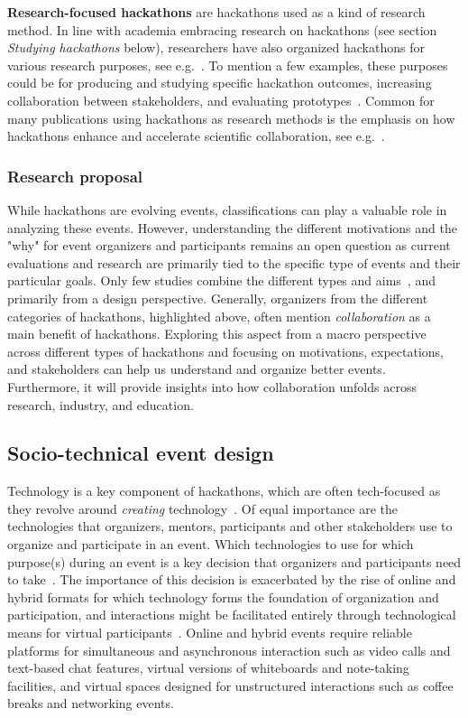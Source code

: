 \documentclass{ieeeaccess}
\begin{document}
\textbf{Research-focused hackathons} are hackathons used as a kind of research method.
In line with academia embracing research on hackathons (see section \textit{Studying hackathons} below), researchers have also organized hackathons for various research purposes, see e.g.~\cite{pe2019understanding,ghouila2018hackathons,groen2015science,falk202010}.
To mention a few examples, these purposes could be for producing and studying specific hackathon outcomes, increasing collaboration between stakeholders, and evaluating prototypes~\cite{falk202010}. 
Common for many publications using hackathons as research methods is the emphasis on how hackathons enhance and accelerate scientific collaboration, see e.g.~\cite{ghouila2018hackathons}.

\subsubsection{Research proposal}
While hackathons are evolving events, classifications can play a valuable role in analyzing these events. 
However,  understanding the different motivations and the "why" for event organizers and participants remains an open question as current evaluations and research are primarily tied to the specific type of events and their particular goals. 
Only few studies combine the different types and aims~\cite{flus2021design,briscoe2014digital}, and primarily from a design perspective. 
Generally, organizers from the different categories of hackathons, highlighted above, often mention \textit{collaboration} as a main benefit of hackathons.
Exploring this aspect from a macro perspective across different types of hackathons and focusing on motivations, expectations, and stakeholders can help us understand and organize better events. 
Furthermore, it will provide insights into how collaboration unfolds across research, industry, and education.  

\subsection{Socio-technical event design}
Technology is a key component of hackathons, which are often tech-focused as they revolve around \textit{creating} technology~\cite{briscoe2014digital}. 
Of equal importance are the technologies that organizers, mentors, participants and other stakeholders use to organize and participate in an event. 
Which technologies to use for which purpose(s) during an event is a key decision that organizers and participants need to take~\cite{nolte2020organize}. 
The importance of this decision is exacerbated by the rise of online and hybrid formats for which technology forms the foundation of organization and participation, and interactions might be facilitated entirely through technological means for virtual participants~\cite{mendes2022socio}. 
Online and hybrid events require reliable platforms for simultaneous and asynchronous interaction such as video calls and text-based chat features, virtual versions of whiteboards and note-taking facilities, and virtual spaces designed for unstructured interactions such as coffee breaks and networking events. 
\end{document}
